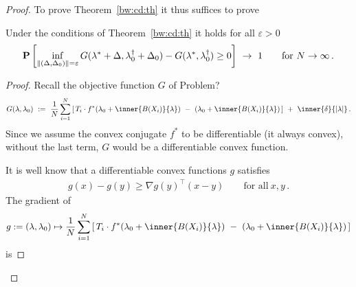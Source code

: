 \begin{proof}
 To prove Theorem~\ref{bw:cd:th}
 it thus suffices to prove
 \begin{lemma}
   Under the conditions of Theorem~\ref{bw:cd:th} it holds
   for all $\varepsilon>0$
\begin{gather}
   \P
   \left[ 
     \inf _ { 
       \norm{
         (
     \Delta
     ,
     \Delta_0
         )
 } 
= \varepsilon }
     G
     (
     \lambda^*
      +
      \Delta
      ,
      \lambda^\dagger_0
      +
     \Delta_0
     )
     -
     G
     (
     \lambda^*,
      \lambda^\dagger_0
     )
     \ge 
     0
   \right]
   \ 
   \to
   \ 
   1
   \qquad
   \text{for}
   \ 
   N\to\infty
   \,.
\end{gather}
 \end{lemma}
 \begin{proof}
  Recall the objective function $G$ of Problem? 
\begin{gather*}
  G(\lambda,\lambda_0)
  \ 
  :=
  \ 
    \frac{1}{N}
\sum_{i=1} 
  ^N
  \left[ 
    \,
  T_i
  \cdot
  f^*
  \!
  \left( 
\lambda_0
+
\inner
{B(X_i)}
{\lambda}
  \right)
  \ 
-
\ 
  \left( 
\lambda_0
+
\inner
{B(X_i)}
{\lambda}
  \right)
  \,
  \right]
  \ 
+
\ 
\inner
{\delta}
{|\lambda|}
\,.
\end{gather*}
   Since we assume the convex conjugate $f^*$ to be differentiable
   (it always convex),
without the last term, $G$ would be a differentiable convex function.

It is well know that a differentiable convex functions $g$ satisfies
  \begin{gather}
    \label{cv:ts:concD}
    g(x)-g(y)
    \ge
    \nabla
    g(y)^\top
    (x-y)
    \qquad 
    \text{for all}\ 
    x,y\,.
  \end{gather}
  The gradient of
  \begin{gather}
    g := 
    (\lambda,\lambda_0)
    \mapsto
    \frac{1}{N}
\sum_{i=1} 
  ^N
  \left[ 
    \,
  T_i
  \cdot
  f^*
  \!
  \left( 
\lambda_0
+
\inner
{B(X_i)}
{\lambda}
  \right)
  \ 
-
\ 
  \left( 
\lambda_0
+
\inner
{B(X_i)}
{\lambda}
  \right)
  \,
  \right]
  \end{gather}
  is 


\end{proof}
\end{proof}
